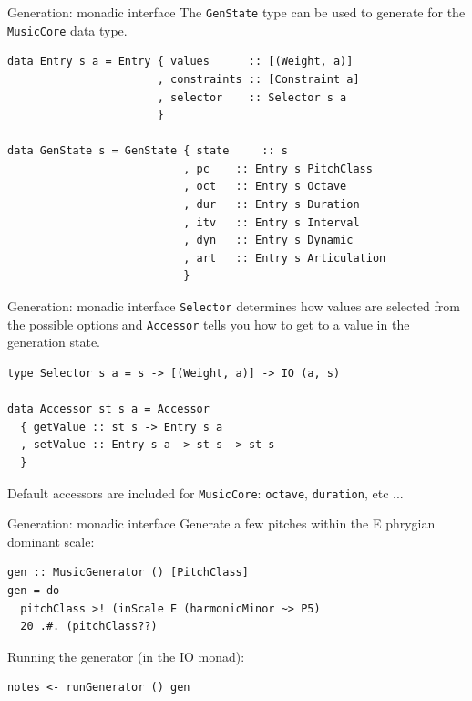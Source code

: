 \documentclass{beamer}
\newcommand{\icode}[1]{\texttt{#1}}
\begin{document}
    \begin{frame}[fragile=singleslide]{Generation: monadic interface}
	The \icode{GenState} type can be used to generate for the \icode{MusicCore} data type.

    \begin{verbatim}
data Entry s a = Entry { values      :: [(Weight, a)]
                       , constraints :: [Constraint a]
                       , selector    :: Selector s a
                       }

data GenState s = GenState { state     :: s
                           , pc    :: Entry s PitchClass
                           , oct   :: Entry s Octave
                           , dur   :: Entry s Duration
                           , itv   :: Entry s Interval
                           , dyn   :: Entry s Dynamic
                           , art   :: Entry s Articulation
                           }
    \end{verbatim}
	\end{frame}

    \begin{frame}[fragile=singleslide]{Generation: monadic interface}
	\icode{Selector} determines how values are selected from the possible options and \icode{Accessor} tells you how to get to a value in the generation state.

    \begin{verbatim}
type Selector s a = s -> [(Weight, a)] -> IO (a, s)

data Accessor st s a = Accessor
  { getValue :: st s -> Entry s a
  , setValue :: Entry s a -> st s -> st s
  }
    \end{verbatim}

    Default accessors are included for \icode{MusicCore}: \icode{octave}, \icode{duration}, etc ...
	\end{frame}

    \begin{frame}[fragile=singleslide]{Generation: monadic interface}
	Generate a few pitches within the E phrygian dominant scale:

    \begin{verbatim}
gen :: MusicGenerator () [PitchClass]
gen = do
  pitchClass >! (inScale E (harmonicMinor ~> P5)
  20 .#. (pitchClass??)
    \end{verbatim}

    Running the generator (in the IO monad):

    \begin{verbatim}
notes <- runGenerator () gen
    \end{verbatim}
	\end{frame}
\end{document}
